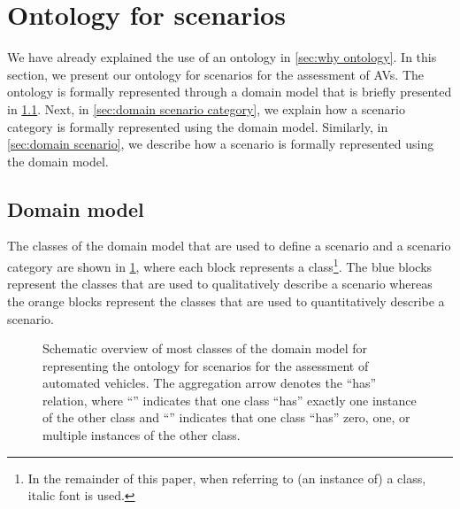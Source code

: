 \section{Ontology for scenarios}
\label{sec:ontology}

We have already explained the use of an ontology in \cref{sec:why ontology}. In this section, we present our ontology for scenarios for the assessment of AVs. 
The ontology is formally represented through a domain model that is briefly presented in \cref{sec:domain model}. Next, in \cref{sec:domain scenario category}, we explain how a scenario category is formally represented using the domain model. Similarly, in \cref{sec:domain scenario}, we describe how a scenario is formally represented using the domain model. 



\subsection{Domain model}
\label{sec:domain model}

The classes of the domain model that are used to define a scenario and a scenario category are shown in \cref{fig:ontology classes}, where each block represents a class\footnote{In the remainder of this paper, when referring to (an instance of) a class, italic font is used.}.
The blue blocks represent the classes that are used to qualitatively describe a scenario whereas the orange blocks represent the classes that are used to quantitatively describe a scenario. 

\begin{figure}
	\centering
	
	\caption{Schematic overview of most classes of the domain model for representing the ontology for scenarios for the assessment of automated vehicles. The aggregation arrow denotes the ``has'' relation, where ``\hasone'' indicates that one class ``has'' exactly one instance of the other class and ``\hasn'' indicates that one class ``has'' zero, one, or multiple instances of the other class.}
	\label{fig:ontology classes}
\end{figure}

